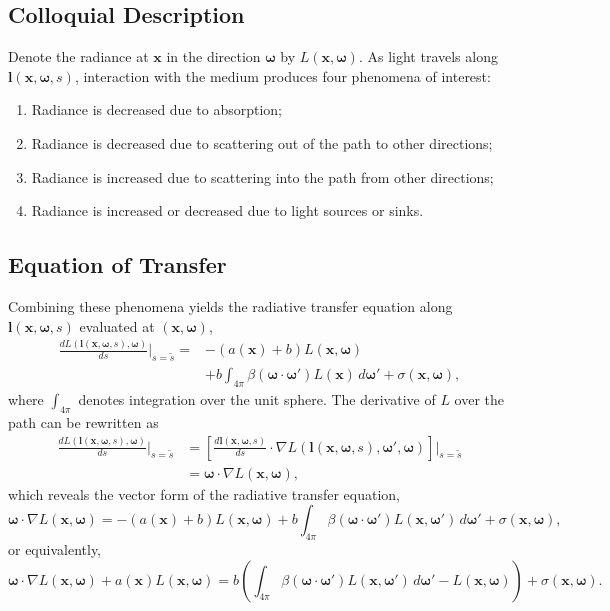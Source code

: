 \documentclass[ms,cpyr,lof,lot]{uathesis}
\renewcommand\vec\bm
\begin{document}
\subsection{Colloquial Description}
Denote the radiance at $\vec{x}$ in the direction $\vec{\omega}$ by $L(\vec{x}, \vec{\omega})$.
As light travels along $\vec{l}(\vec{x}, \vec{\omega}, s)$, interaction with the
medium produces four phenomena of interest:
\begin{enumerate}
  \item Radiance is decreased due to absorption;
  \item Radiance is decreased due to scattering out of the path to other
    directions;
  \item Radiance is increased due to scattering into the path from other
      directions;
  \item Radiance is increased or decreased due to light sources or sinks.
\end{enumerate}

\subsection{Equation of Transfer}
Combining these phenomena yields the radiative transfer equation along
$\vec{l}(\vec{x}, \vec{\omega}, s)$ evaluated at $(\vec{x}, \vec{\omega})$,
\begin{align}
  \label{eqn:rte1d}
  \frac{dL\left(\vec{l}(\vec{x}, \vec{\omega}, s), \vec{\omega}\right)}{ds}\Bigg|_{s=\tilde{s}}
  = &-(a(\vec{x}) + b)L(\vec{x}, \vec{\omega}) \nonumber \\
  &+ b \int_{4\pi} \beta(\vec{\omega}\cdot\vec{\omega}') L(\vec{x})\, d\vec{\omega}' + \sigma(\vec{x}, \vec{\omega}),
\end{align}
where $\int_{4\pi}$ denotes integration over the unit sphere.
The derivative of $L$ over the path can be rewritten as
\begin{align*}
  \frac{dL\left(\vec{l}(\vec{x}, \vec{\omega}, s), \vec{\omega}\right)}{ds}\Bigg|_{s=\tilde{s}}
    &= \left[\frac{d\vec{l}(\vec{x}, \vec{\omega}, s)}{ds} \cdot \nabla L(\vec{l}(\vec{x}, \vec{\omega}, s), \vec{\omega}', \vec{\omega})\right]\Bigg|_{s=\tilde{s}} \\
    &= \vec{\omega} \cdot \nabla L(\vec{x}, \vec{\omega}),
\end{align*}
which reveals the vector form of the radiative transfer equation,
\begin{equation*}
  \vec{\omega} \cdot \nabla L(\vec{x}, \vec{\omega})
  = -(a(\vec{x}) + b)L(\vec{x}, \vec{\omega})
  + b \int_{4\pi} \beta(\vec{\omega}\cdot\vec{\omega}') L(\vec{x}, \vec{\omega}')\, d\vec{\omega}' + \sigma(\vec{x}, \vec{\omega}),
\end{equation*}
or equivalently,
\begin{equation}
  \vec{\omega} \cdot \nabla L(\vec{x}, \vec{\omega})
  + a(\vec{x})L(\vec{x}, \vec{\omega})
  = b \left(
    \int_{4\pi} \beta(\vec{\omega}\cdot\vec{\omega}') L(\vec{x}, \vec{\omega}')\, d\vec{\omega}'
    - L(\vec{x}, \vec{\omega})
  \right)+ \sigma(\vec{x}, \vec{\omega}).
  \label{eqn:rte}
\end{equation}
\end{document}
